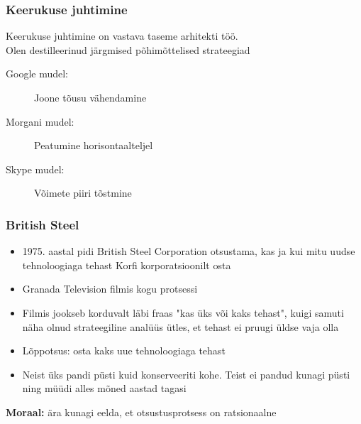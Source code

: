 \begin{frame}[fragile]
  \frametitle{Keerukuse juhtimine}
  	Keerukuse juhtimine on vastava taseme arhitekti töö. \\
	Olen destilleerinud järgmised põhimõttelised strateegiad
	\begin{description}
	\item[Google mudel:] Joone tõusu vähendamine
	\item[Morgani mudel:] Peatumine horisontaalteljel
	\item[Skype mudel:] Võimete piiri tõstmine
\end{description}
\end{frame}


\begin{frame}[fragile]
  \frametitle{British Steel}
	\begin{itemize}
		\item 1975. aastal pidi British Steel Corporation otsustama, kas ja kui mitu uudse tehnoloogiaga tehast Korfi korporatsioonilt osta 
		\item Granada Television filmis kogu protsessi
		\item Filmis jookseb korduvalt läbi fraas "kas üks või kaks tehast", kuigi samuti näha olnud strateegiline analüüs ütles, et tehast ei pruugi üldse vaja olla
		\item Lõppotsus: osta kaks uue tehnoloogiaga tehast
		\item Neist üks pandi püsti kuid konserveeriti kohe. Teist ei pandud kunagi püsti ning müüdi alles mõned aastad tagasi
	\end{itemize}
	\begin{center}
		\textbf{Moraal:} ära kunagi eelda, et otsustusprotsess on ratsionaalne
	\end{center}
\end{frame}

